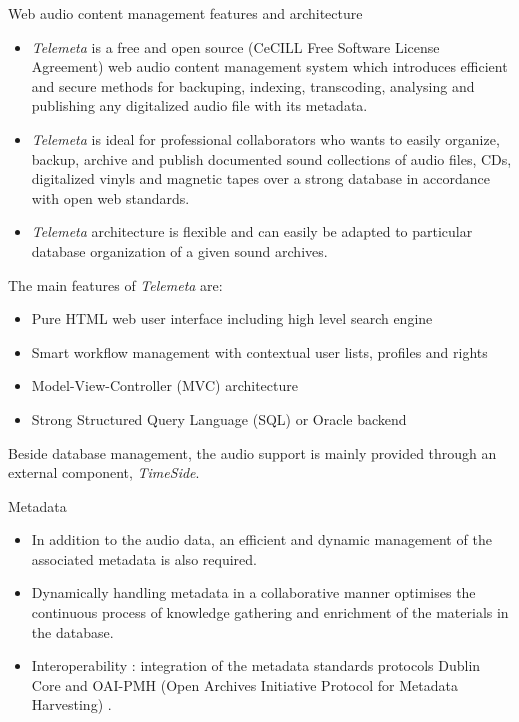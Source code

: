 \documentclass[final, hyperref, table]{beamer}
\begin{document}
\begin{frame}[containsverbatim]{}
\begin{columns}[t]
\begin{column}[T]{.33\linewidth}
\begin{block}{Web audio content management features and architecture}
\vspace{-0.5cm}  
\begin{itemize}
  \item \emph{Telemeta} is a free and open source ({\scriptsize CeCILL
      Free Software License Agreement}) web audio content management
    system which introduces efficient and secure methods for
    \alert{backuping}, \alert{indexing}, \alert{transcoding}, \alert{analysing} and \alert{publishing} any
    digitalized audio file with its metadata.
  \item \emph{Telemeta} is ideal for
    professional collaborators who wants to easily organize, backup, archive and
    publish documented sound collections of audio files, CDs,
    digitalized vinyls and magnetic tapes over a strong database in
    accordance with \alert{open web standards}.
  \item \emph{Telemeta} architecture
    is \alert{flexible} and can easily be adapted to particular database
    organization of a given sound archives.
  \end{itemize}

The main features of \emph{Telemeta} are:
\vspace{-0.1cm}
\begin{itemize}
\item \alert{Pure HTML} web user interface including high level \alert{search engine}
\item \alert{Smart workflow management} with contextual user lists, profiles and rights
\item Model-View-Controller (\alert{MVC}) architecture 
\item Strong Structured Query Language (\alert{SQL}) or Oracle backend
\end{itemize}
Beside database management, the audio support is mainly provided through an external component, \emph{TimeSide}.

\end{block}
\begin{block}{Metadata}
\vspace{-0.5cm}
  \begin{itemize}
  \item In addition to the audio data, an efficient and \alert{dynamic
    management} of the associated metadata is also required.
  \item Dynamically handling metadata in a \alert{collaborative} manner optimises
    the continuous process of knowledge gathering and enrichment of
    the materials in the database.
  \item Interoperability : integration of the metadata standards protocols \alert{Dublin Core}
    and \alert{OAI-PMH} (Open Archives Initiative Protocol for Metadata
    Harvesting) \cite{DublinCore,OAI-PMH}.
  \end{itemize}


\end{block}
\end{column}
\end{columns}
\end{frame}
\end{document}
